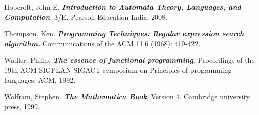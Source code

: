 \documentclass[12pt,reqno]{amsart}
\begin{document}
\begin{thebibliography}{99} %

Hopcroft, John E. \textbf{\textit{Introduction to Automata Theory, Languages, and Computation}}, 3/E. Pearson Education India, 2008.

Thompson, Ken. \textbf{\textit{Programming Techniques: Regular expression search algorithm.}} Communications of the ACM 11.6 (1968): 419-422.

Wadler, Philip. \textbf{\textit{The essence of functional programming}}. Proceedings of the 19th ACM SIGPLAN-SIGACT symposium on Principles of programming languages. ACM, 1992.


Wolfram, Stephen. \textbf{\textit{The Mathematica Book}}, Version 4. Cambridge university press, 1999.

\end{thebibliography}
\end{document}
